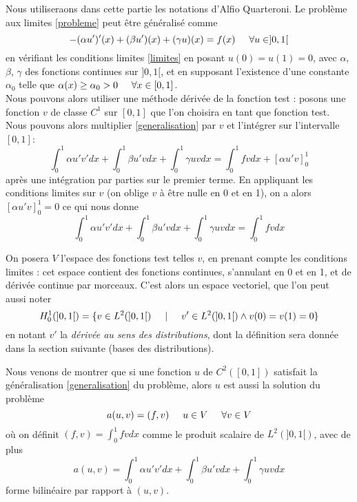 \documentclass[12pt]{article}
\newcommand{\espace}{\hspace{5mm}}
\begin{document}
Nous utiliseraons dans cette partie les notations d'Alfio Quarteroni. Le problème aux limites \eqref{probleme} peut être généralisé comme
\begin{equation} \label{generalisation}
-(\alpha u')'(x) + (\beta u')(x) + (\gamma u)(x) = f(x) \espace \forall u \in ]0,1[
\end{equation}
en vérifiant les conditions limites \eqref{limites} en posant $u(0) = u(1) = 0$, avec $\alpha$, $\beta$, $\gamma$ des fonctions continues sur $]0,1[$, et en supposant l'existence d'une constante $\alpha_0$ telle que $\alpha(x) \ge \alpha_0 > 0 \espace \forall x \in [0,1]$. \\
\quad Nous pouvons alors utiliser une méthode dérivée de la fonction test : posons une fonction $v$ de classe $C^1$ sur $[0,1]$ que l'on choisira en tant que fonction test. Nous pouvons alors multiplier \eqref{generalisation} par $v$ et l'intégrer sur l'intervalle $[0,1]$:
\begin{equation} \label{patéIntegrale}
\int_0^1 \alpha u' v' dx + \int_0^1 \beta u' v dx + \int_0^1 \gamma u v dx = \int_0^1 fv dx + [\alpha u' v]_0^1
\end{equation}
après une intégration par parties sur le premier terme. En appliquant les conditions limites sur $v$ (on oblige $v$ à être nulle en 0 et en 1), on a alors $[\alpha u' v]_0^1 = 0$ ce qui nous donne
\begin{equation}
\int_0^1 \alpha u' v' dx + \int_0^1 \beta u' v dx + \int_0^1 \gamma u v dx = \int_0^1 fv dx 
\end{equation}

On posera $V$ l'espace des fonctions test telles $v$, en prenant compte les conditions limites : cet espace contient des fonctions continues, s'annulant en 0 et en 1, et de dérivée continue par morceaux. C'est alors un espace vectoriel, que l'on peut aussi noter 
\begin{equation}
H_0^1(]0,1[) = \{v \in L^2(]0,1[) \espace | \espace v' \in L^2(]0,1[) \wedge v(0) = v(1) = 0\}
\end{equation}
en notant $v'$ la \emph{dérivée au sens des distributions}, dont la définition sera donnée dans la section suivante (bases des distributions).

Nous venons de montrer que si une fonction $u$ de $C^2([0,1])$ satisfait la généralisation \eqref{generalisation} du problème, alors $u$ est aussi la solution du problème
\begin{equation} \label{problemeSecondaire}
a(u,v) = (f,v) \espace u \in V \espace \forall v \in V
\end{equation}
où on définit $(f,v) = \int_0^1 fv dx$ comme le produit scalaire de $L^2(]0,1[)$, avec de plus
\begin{equation}
a(u,v) = \int_0^1 \alpha u' v' dx + \int_0^1 \beta u' v dx + \int_0^1 \gamma u v dx
\end{equation}
forme bilinéaire par rapport à $(u,v)$.
\end{document}
